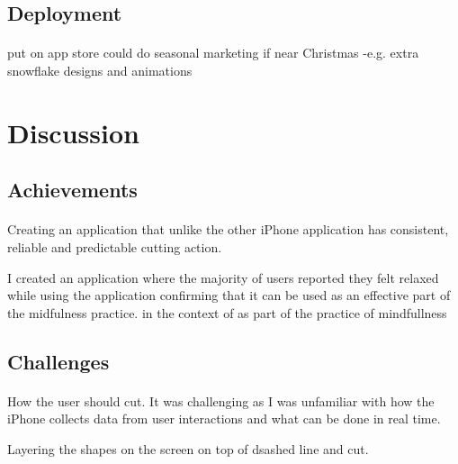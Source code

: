 \documentclass[11pt]{article}
\begin{document}
    \subsection{Deployment}
        \paragraph{}
        put on app store
        could do seasonal marketing if near Christmas -e.g. extra snowflake designs and animations
        
    
\newpage
\section{Discussion}
    \paragraph{}

    
    \subsection{Achievements}
    
        \paragraph{}
        Creating an application that unlike the other iPhone application has consistent, reliable and predictable cutting action. 
        
        I created an application where the majority of users reported they felt relaxed while using the application confirming that it can be used 
        as an effective part of the midfulness practice. 
        in the context of as part of the practice of mindfullness 
    
    \subsection{Challenges}
    
        \paragraph{}
        How the user should cut. It was challenging as I was unfamiliar with how the iPhone collects data from user interactions and what can be done in real time. 
        
        
        Layering the shapes on the screen on top of dsashed line and cut.
        
\end{document}
